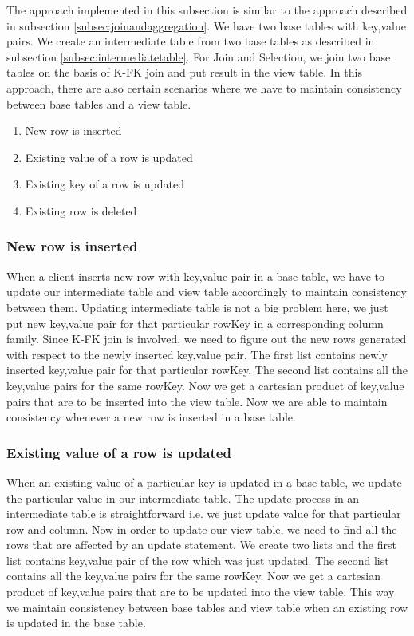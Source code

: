 \documentclass[11pt,a4paper,bibtotoc,idxtotoc,headsepline,footsepline,footexclude,BCOR12mm,DIV13]{scrbook}
\begin{document}
The approach implemented in this subsection is similar to the approach described in subsection \ref{subsec:joinandaggregation}. We have two base tables with key,value pairs. We create an intermediate table from two base tables as described in subsection \ref{subsec:intermediatetable}. For Join and Selection, we join two base tables on the basis of K-FK join and put result in the view table. In this approach, there are also certain scenarios where we have to maintain consistency between base tables and a view table.

\begin{enumerate}
	\item New row is inserted
	\item Existing value of a row is updated
	\item Existing key of a row is updated
	\item Existing row is deleted
\end{enumerate}

\subsubsection{New row is inserted}
\label{New row is inserted JoinSelection}
When a client inserts new row with key,value pair in a base table, we have to update our intermediate table and view table accordingly to maintain consistency between them. Updating intermediate table is not a big problem here, we just put new key,value pair for that particular rowKey in a corresponding column family. Since K-FK join is involved, we need to figure out the new rows generated with respect to the newly inserted key,value pair. The first list contains newly inserted key,value pair for that particular rowKey. The second list contains all the key,value pairs for the same rowKey. Now we get a cartesian product of key,value pairs that are to be inserted into the view table. Now we are able to maintain consistency whenever a new row is inserted in a base table.

\subsubsection{Existing value of a row is updated} 
When an existing value of a particular key is updated in a base table, we update the particular value in our intermediate table. The update process in an intermediate table is straightforward i.e. we just update value for that particular row and column. Now in order to update our view table, we need to find all the rows that are affected by an update statement. We create two lists and the first list contains key,value pair of the row which was just updated. The second list contains all the key,value pairs for the same rowKey. Now we get a cartesian product of key,value pairs that are to be updated into the view table. This way we maintain consistency between base tables and view table when an existing row is updated in the base table.
\end{document}
